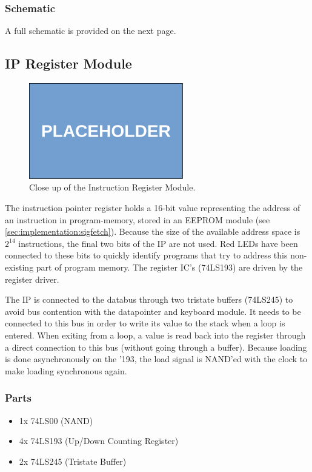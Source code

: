 \subsubsection*{Schematic}
A full schematic is provided on the next page.



\subsection{IP Register Module}
\begin{figure}[H]
  \centering
  \includegraphics[width=0.6\textwidth]{img/placeholder}
  \caption{Close up of the Instruction Register Module.}
  \label{fig:iregcloseup}
\end{figure}

The instruction pointer register holds a 16-bit value representing the address of an instruction in program-memory, stored in an EEPROM module (see \ref{sec:implementation:sigfetch}). Because the size of the available address space is $2^{14}$ instructions, the final two bits of the IP are not used. Red LEDs have been connected to these bits to quickly identify programs that try to address this non-existing part of program memory. The register IC's (74LS193) are driven by the register driver.

The IP is connected to the databus through two tristate buffers (74LS245) to avoid bus contention with the datapointer and keyboard module. It needs to be connected to this bus in order to write its value to the stack when a loop is entered. When exiting from a loop, a value is read back into the register through a direct connection to this bus (without going through a buffer). Because loading is done asynchronously on the '193, the load signal is NAND'ed with the clock to make loading synchronous again.

\subsubsection*{Parts}
\begin{itemize}\itemsep0em
\item 1x 74LS00 (NAND)
\item 4x 74LS193 (Up/Down Counting Register)
\item 2x 74LS245 (Tristate Buffer)
\end{itemize}

